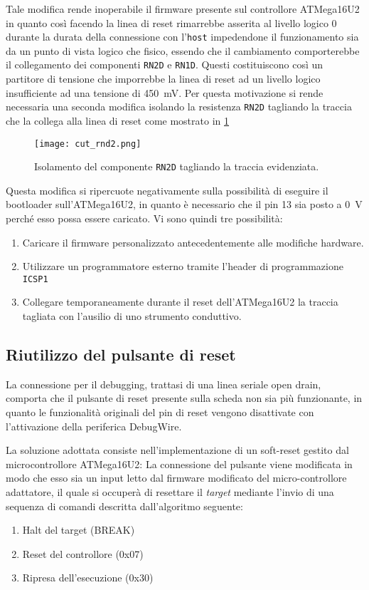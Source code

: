 Tale modifica rende inoperabile il firmware presente sul controllore ATMega16U2 in quanto così facendo la linea di reset rimarrebbe asserita al livello logico 0 durante la durata della connessione con l'\texttt{host} impedendone il funzionamento sia da un punto di vista logico che fisico, essendo che il cambiamento comporterebbe il collegamento dei componenti \texttt{RN2D} e \texttt{RN1D}. Questi costituiscono così un partitore di tensione che imporrebbe la linea di reset ad un livello logico insufficiente ad una tensione di \SI{450}{\milli\volt}. 
Per questa motivazione si rende necessaria una seconda modifica isolando la resistenza \texttt{RN2D} tagliando la traccia che la collega alla linea di reset come mostrato in \cref{fig:cut-rnd2}

\begin{figure}[b]
    \centering
    \texttt{[image: cut\_rnd2.png]}
    \caption[]{Isolamento del componente \texttt{RN2D} tagliando la traccia evidenziata.}\label{fig:cut-rnd2}
\end{figure}

Questa modifica si ripercuote negativamente sulla possibilità di eseguire il bootloader sull'ATMega16U2, in quanto è necessario che il pin 13 sia posto a \SI{0}{\volt} perché esso possa essere caricato\cite[sec 23.6.3]{avr:m16u2}. Vi sono quindi tre possibilità:
\begin{enumerate}
    \item Caricare il firmware personalizzato antecedentemente alle modifiche hardware.
    \item Utilizzare un programmatore esterno tramite l'header di programmazione \texttt{ICSP1}
    \item Collegare temporaneamente durante il reset dell'ATMega16U2 la traccia tagliata con l'ausilio di uno strumento conduttivo.
\end{enumerate} 

\subsection{Riutilizzo del pulsante di reset}

La connessione per il debugging, trattasi di una linea seriale open drain, comporta che il pulsante di reset presente sulla scheda non sia più funzionante, in quanto le funzionalità originali del pin di reset vengono disattivate con l'attivazione della periferica DebugWire.

La soluzione adottata consiste nell'implementazione di un soft-reset gestito dal microcontrollore ATMega16U2: La connessione del pulsante viene modificata in modo che esso sia un input letto dal firmware modificato del micro-controllore adattatore, il quale si occuperà di resettare il \textit{target} mediante l'invio di una sequenza di comandi descritta dall'algoritmo seguente:
\begin{enumerate}
    \item Halt del target (BREAK)
    \item Reset del controllore (0x07)
    \item Ripresa dell'esecuzione (0x30)
\end{enumerate}

